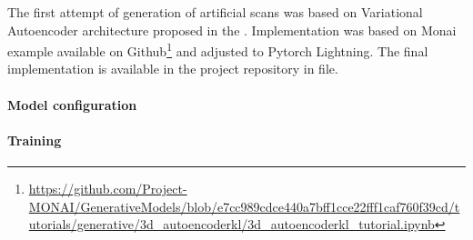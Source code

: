 The first attempt of generation of artificial scans was based on Variational Autoencoder architecture proposed in the \cite{rombach2022high}. Implementation was based on Monai\cite{Cardoso_MONAI_An_open-source_2022} example available on Github\footnote{\url{https://github.com/Project-MONAI/GenerativeModels/blob/e7cc989cdce440a7bff1cce22fff1caf760f39cd/tutorials/generative/3d_autoencoderkl/3d_autoencoderkl_tutorial.ipynb}} and adjusted to Pytorch Lightning. The final implementation is available in the project repository in file.

\paragraph{Model configuration}

\paragraph{Training}

